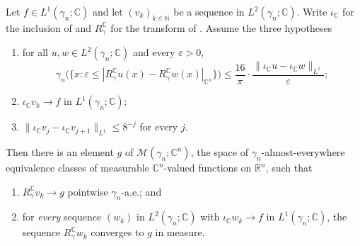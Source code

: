 \begin{lemma}
Let $f \in L^1(\gamma_n;\mathbb{C})$ and let $(v_k)_{k\in\mathbb{N}}$ be a
sequence in $L^2(\gamma_n;\mathbb{C})$.  Write $\iota_{\mathbb{C}}$ for the
inclusion of  and $R_\gamma^{\mathbb{C}}$ for the transform
of .  Assume the three hypotheses
\begin{enumerate}
  \item[(A)] for all $u,w \in L^2(\gamma_n;\mathbb{C})$ and every
    $\varepsilon > 0$,
    \[
      \gamma_n\bigl(\{x : \varepsilon \leq |R_\gamma^{\mathbb{C}} u(x)
        - R_\gamma^{\mathbb{C}} w(x)|_{\mathbb{C}^n}\}\bigr)
        \leq \frac{16}{\pi}\cdot
          \frac{\|\iota_{\mathbb{C}} u - \iota_{\mathbb{C}} w\|_{L^1}}{\varepsilon} ;
    \]
  \item[(L)] $\iota_{\mathbb{C}} v_k \to f$ in $L^1(\gamma_n;\mathbb{C})$;
  \item[(C)] $\|\iota_{\mathbb{C}} v_j - \iota_{\mathbb{C}} v_{j+1}\|_{L^1}
    \leq 8^{-j}$ for every $j$.
\end{enumerate}
Then there is an element $g$ of $\mathcal{M}(\gamma_n;\mathbb{C}^n)$, the space
of $\gamma_n$-almost-everywhere equivalence classes of measurable
$\mathbb{C}^n$-valued functions on $\mathbb{R}^n$, such that
\begin{enumerate}
  \item $R_\gamma^{\mathbb{C}} v_k \to g$ pointwise $\gamma_n$-a.e.; and
  \item for \emph{every} sequence $(w_k)$ in $L^2(\gamma_n;\mathbb{C})$ with
    $\iota_{\mathbb{C}} w_k \to f$ in $L^1(\gamma_n;\mathbb{C})$, the sequence
    $R_\gamma^{\mathbb{C}} w_k$ converges to $g$ in measure.
\end{enumerate}
\end{lemma}
